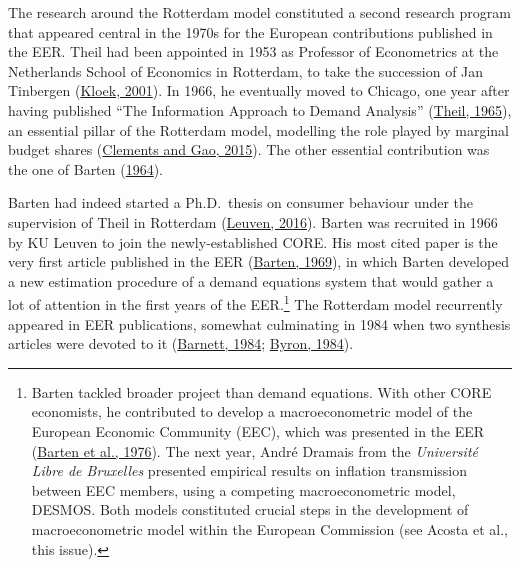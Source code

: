 \documentclass[
  12pt,
  onecolumn]{article}
\begin{document}
The research around the Rotterdam model constituted a second research
program that appeared central in the 1970s for the European
contributions published in the EER. Theil had been appointed in 1953 as
Professor of Econometrics at the Netherlands School of Economics in
Rotterdam, to take the succession of Jan Tinbergen
(\protect\hyperlink{ref-kloek2001}{Kloek, 2001}). In 1966, he eventually
moved to Chicago, one year after having published ``The Information
Approach to Demand Analysis'' (\protect\hyperlink{ref-theil1965}{Theil,
1965}), an essential pillar of the Rotterdam model, modelling the role
played by marginal budget shares
(\protect\hyperlink{ref-clements2015a}{Clements and Gao, 2015}). The
other essential contribution was the one of Barten
(\protect\hyperlink{ref-barten1964}{1964}).

Barten had indeed started a Ph.D.~thesis on consumer behaviour under the
supervision of Theil in Rotterdam
(\protect\hyperlink{ref-kuleuven2016}{Leuven, 2016}). Barten was
recruited in 1966 by KU Leuven to join the newly-established CORE. His
most cited paper is the very first article published in the EER
(\protect\hyperlink{ref-barten1969}{Barten, 1969}), in which Barten
developed a new estimation procedure of a demand equations system that
would gather a lot of attention in the first years of the
EER.\footnote{Barten tackled broader project than demand equations. With
  other CORE economists, he contributed to develop a macroeconometric
  model of the European Economic Community (EEC), which was presented in
  the EER (\protect\hyperlink{ref-barten1976}{Barten et al., 1976}). The
  next year, André Dramais from the \emph{Université Libre de Bruxelles}
  presented empirical results on inflation transmission between EEC
  members, using a competing macroeconometric model, DESMOS. Both models
  constituted crucial steps in the development of macroeconometric model
  within the European Commission (see Acosta et al., this issue).} The
Rotterdam model recurrently appeared in EER publications, somewhat
culminating in 1984 when two synthesis articles were devoted to it
(\protect\hyperlink{ref-barnett1984}{Barnett, 1984};
\protect\hyperlink{ref-byron1984}{Byron, 1984}).
\end{document}
